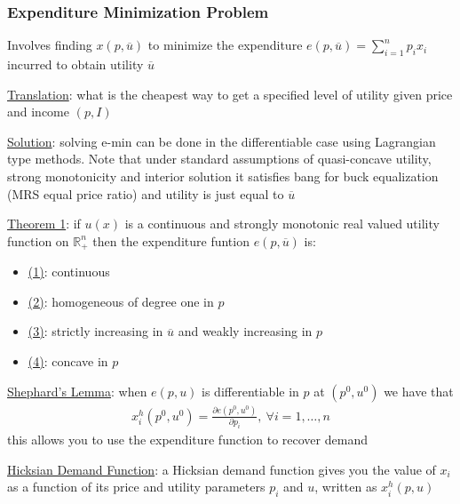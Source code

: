 \documentclass{article}
\begin{document}
\subsubsection{Expenditure Minimization Problem}
Involves finding $x(p, \overline{u})$ to minimize the expenditure $e(p,\overline{u}) = \sum_{i=1}^{n}p_{i}x_{i}$ incurred to obtain utility $\overline{u}$ \par \vspace{0.3em}
\vspace{6mm}
  \underline{Translation}: what is the cheapest way to get a specified level of utility given price and income $(p, I)$
  \par
  \underline{Solution}: solving e-min can be done in the differentiable case using Lagrangian type methods. Note that under standard assumptions of quasi-concave utility, strong monotonicity and interior solution it satisfies bang for buck equalization (MRS equal price ratio) and utility is just equal to $\overline{u}$
  \par
  \underline{Theorem 1}: if $u(x)$ is a continuous and strongly monotonic real valued utility function on $\mathbb{R}_{+}^{n}$ then the expenditure funtion $e(p, \overline{u})$ is:
  \begin{itemize}
    \item  \underline{(1)}: continuous
    \item  \underline{(2)}: homogeneous of degree one in $p$
    \item  \underline{(3)}: strictly increasing in $\overline{u}$ and weakly increasing in $p$
    \item  \underline{(4)}: concave in $p$
  \end{itemize}
  \par
  \underline{Shephard's Lemma}: when $e(p,u)$ is differentiable in $p$ at $(p^{0}, u^{0})$ we have that
  \begin{gather*}
    x_{i}^{h}(p^{0},u^{0}) = \frac{\partial e(p^{0},u^{0})}{\partial p_{i}}, \ \forall i = 1, \dots, n
  \end{gather*}
  this allows you to use the expenditure function to recover demand
  \par
  \underline{Hicksian Demand Function}: a Hicksian demand function gives you the value of $x_{i}$ as a function of its price and utility parameters $p_{i}$ and $u$, written as $x_{i}^{h}(p,u)$
\end{document}
